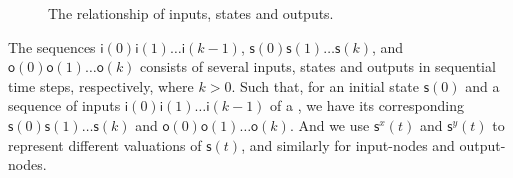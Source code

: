  \begin{figure}[!t]
      \centering
      
      \caption{The relationship of inputs, states and outputs.}
      \label{fig:10}
  \end{figure}
   The sequences $\mathsf{i}(0)\mathsf{i}(1)\ldots\mathsf{i}(k-1)$,  $\mathsf{s}(0)\mathsf{s}(1)\ldots\mathsf{s}(k)$, and $\mathsf{o}(0)\mathsf{o}(1)\ldots\mathsf{o}(k)$ 
 consists of several inputs, states and outputs in sequential time steps,  respectively, where $k>0$. 
 Such that, for an initial state $\mathsf{s}(0)$ and a  sequence of inputs $\mathsf{i}(0)\mathsf{i}(1)\ldots\mathsf{i}(k-1)$ of a \BCN, we have its corresponding 
$\mathsf{s}(0)\mathsf{s}(1)\ldots\mathsf{s}(k)$ and $\mathsf{o}(0)\mathsf{o}(1)\ldots\mathsf{o}(k)$.  
And we use $\mathsf{s}^{x}(t)$ and $\mathsf{s}^{y}(t)$ to represent different valuations of $\mathsf{s}(t)$, and similarly for input-nodes and output-nodes. 

